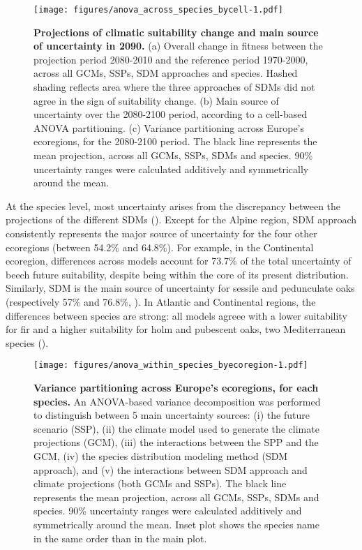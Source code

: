 \documentclass[letterpaper,8pt]{article}  %
\begin{document}
\begin{doublespacing}
\begin{linenumbers}
\begin{figure}[hp]
\centering
\begin{subcaptiongroup}
\label{fig:anova2090A} 
\label{fig:anova2090B}
\label{fig:anova2090C}
\end{subcaptiongroup}
\texttt{[image: figures/anova\_across\_species\_bycell-1.pdf]}
\caption{\textbf{Projections of climatic suitability change and main source of uncertainty in 2090.} (a) Overall change in fitness between the projection period 2080-2010 and the reference period 1970-2000, across all GCMs, SSPs, SDM approaches and species. Hashed shading reflects area where the three approaches of SDMs did not agree in the sign of suitability change. (b) Main source of uncertainty over the 2080-2100 period, according to a cell-based ANOVA partitioning. (c) Variance partitioning across Europe's ecoregions, for the 2080-2100 period. The black line represents the mean projection, across all GCMs, SSPs, SDMs and species. 90\% uncertainty ranges were calculated additively and symmetrically around the mean.}
\label{fig:anova2090}
\end{figure}

At the species level, most uncertainty arises from the discrepancy between the projections of the different SDMs (). Except for the Alpine region, SDM approach consistently represents the major source of uncertainty for the four other ecoregions (between 54.2\% and 64.8\%). For example, in the Continental ecoregion, differences across models account for 73.7\% of the total uncertainty of beech future suitability, despite being within the core of its present distribution. Similarly, SDM is the main source of uncertainty for sessile and pedunculate oaks (respectively 57\% and 76.8\%, ). In Atlantic and Continental regions, the differences between species are strong: all models agreee with a lower suitability for fir and a higher suitability for holm and pubescent oaks, two Mediterranean species (). 

\begin{SCfigure}
\texttt{[image: figures/anova\_within\_species\_byecoregion-1.pdf]}
\caption{\textbf{Variance partitioning across Europe's ecoregions, for each species.} An ANOVA-based variance decomposition was performed to distinguish between 5 main uncertainty sources: (i) the future scenario (SSP), (ii) the climate model used to generate the climate projections (GCM), (iii) the interactions between the SPP and the GCM, (iv) the species distribution modeling method (SDM approach), and (v) the interactions between SDM approach and climate projections (both GCMs and SSPs). The black line represents the mean projection, across all GCMs, SSPs, SDMs and species. 90\% uncertainty ranges were calculated additively and symmetrically around the mean. Inset plot shows the species name in the same order than in the main plot.}
\label{fig:anovawithinspecies}
\end{SCfigure} 


\end{linenumbers}
\end{doublespacing}
\end{document}

